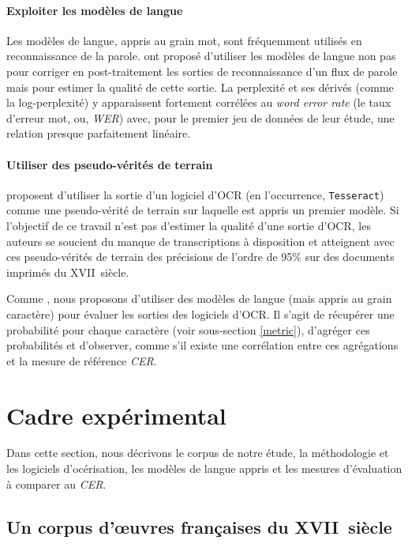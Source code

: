 \documentclass[10pt,twoside]{article}
\begin{document}
    \paragraph{Exploiter les modèles de langue}
    Les modèles de langue, appris au grain mot, sont fréquemment utilisés en reconnaissance de la parole. 
    \cite{Chen1998a} ont proposé d'utiliser les modèles de langue non pas pour corriger en post-traitement les 
    sorties de reconnaissance d'un flux de parole mais pour estimer la qualité de cette sortie. La perplexité et ses dérivés 
    (comme la log-perplexité) y apparaissent fortement corrélées au \textit{word error rate} (le taux d'erreur mot, ou, 
    \textit{WER}) avec, pour le premier jeu de données de leur étude, une relation presque parfaitement linéaire.

    \paragraph{Utiliser des pseudo-vérités de terrain}
    \cite{UlHasan2016a} proposent d'utiliser la sortie d'un logiciel d'OCR (en l'occurrence, \verb!Tesseract!)
    comme une pseudo-vérité de terrain sur laquelle est appris un premier modèle. Si l'objectif de ce travail n'est 
    pas d'estimer la qualité d'une sortie d'OCR, les auteurs se soucient du manque de transcriptions à disposition
    et atteignent avec ces pseudo-vérités de terrain des précisions de l'ordre de 95\% sur des documents imprimés du
    XVII\ieme~siècle.

Comme \cite{Chen1998a}, nous proposons d'utiliser des modèles de langue (mais appris au grain caractère)
pour évaluer les sorties des logiciels d'OCR. Il s'agit de récupérer une probabilité pour chaque caractère (voir
sous-section \ref{metric}), d'agréger ces probabilités et d'observer, comme \cite{Springmann2016a} s'il
existe une corrélation entre ces agrégations et la mesure de référence \textit{CER}.


\section{Cadre expérimental}\label{cadre}
Dans cette section, nous décrivons le corpus de notre étude, la méthodologie et les logiciels d'océrisation, 
les modèles de langue appris et les mesures d'évaluation à comparer au \textit{CER}.

    \subsection{Un corpus d'\oe{}uvres françaises du XVII\ieme~siècle}
        
\end{document}
